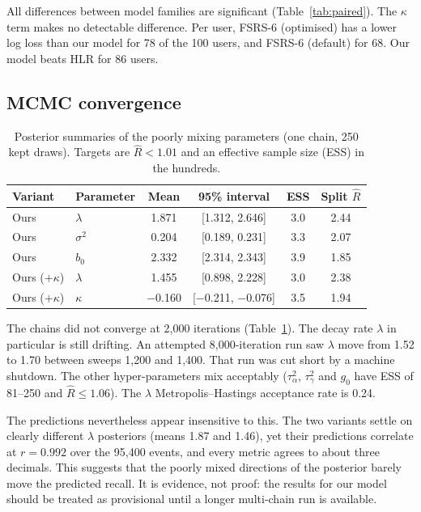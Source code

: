 \documentclass[11pt,a4paper]{article}
\begin{document}
All differences between model families are significant (Table~\ref{tab:paired}). The $\kappa$ term makes no detectable difference. Per user, FSRS-6 (optimised) has a lower log loss than our model for 78 of the 100 users, and FSRS-6 (default) for 68. Our model beats HLR for 86 users.

\subsection{MCMC convergence}
\begin{table}[H]
\centering
\caption{Posterior summaries of the poorly mixing parameters (one chain, 250 kept draws). Targets are $\hat R<1.01$ and an effective sample size (ESS) in the hundreds.}
\label{tab:mcmc}
\small
\begin{tabular}{llcccc}
\toprule
Variant & Parameter & Mean & 95\% interval & ESS & Split $\hat R$\\
\midrule
Ours & $\lambda$ & 1.871 & [1.312, 2.646] & 3.0 & 2.44 \\
Ours & $\sigma^2$ & 0.204 & [0.189, 0.231] & 3.3 & 2.07 \\
Ours & $b_0$ & 2.332 & [2.314, 2.343] & 3.9 & 1.85 \\
Ours ($+\kappa$) & $\lambda$ & 1.455 & [0.898, 2.228] & 3.0 & 2.38 \\
Ours ($+\kappa$) & $\kappa$ & $-$0.160 & [$-$0.211, $-$0.076] & 3.5 & 1.94 \\
\bottomrule
\end{tabular}
\end{table}

The chains did not converge at 2{,}000 iterations (Table~\ref{tab:mcmc}). The decay rate $\lambda$ in particular is still drifting. An attempted 8{,}000-iteration run saw $\lambda$ move from 1.52 to 1.70 between sweeps 1{,}200 and 1{,}400. That run was cut short by a machine shutdown. The other hyper-parameters mix acceptably ($\tau^2_\alpha$, $\tau^2_\gamma$ and $g_0$ have ESS of 81--250 and $\hat R \le 1.06$). The $\lambda$ Metropolis--Hastings acceptance rate is 0.24.

The predictions nevertheless appear insensitive to this. The two variants settle on clearly different $\lambda$ posteriors (means 1.87 and 1.46), yet their predictions correlate at $r=0.992$ over the 95{,}400 events, and every metric agrees to about three decimals. This suggests that the poorly mixed directions of the posterior barely move the predicted recall. It is evidence, not proof: the results for our model should be treated as provisional until a longer multi-chain run is available.
\end{document}
